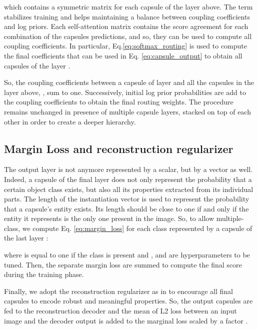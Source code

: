 \documentclass{article}
\begin{document}
\begin{ceqn}

\end{ceqn}
which contains a symmetric matrix  for each capsule  of the layer above. The term  stabilizes training and helps maintaining a balance between coupling coefficients and log priors. Each self-attention matrix contains the score agreement for each combination of the  capsules predictions, and so, they can be used to compute all coupling coefficients. In particular, Eq.\ref{eq:softmax_routing} is used to compute the final coefficients that can be used in Eq. \ref{eq:capsule_output} to obtain all capsules  of the layer .
\begin{ceqn}

\end{ceqn}
So, the coupling coefficients between a capsule of layer  and all the capsules in the layer above, , sum to one. Successively, initial log prior probabilities are add to the coupling coefficients to obtain the final routing weights. The procedure remains unchanged in presence of multiple capsule layers, stacked on top of each other in order to create a deeper hierarchy. 
\subsection{Margin Loss and reconstruction regularizer}
The output layer is not anymore represented by a scalar, but by a vector as well. Indeed, a capsule of the final layer does not only represent the probability that a certain object class exists, but also all its properties extracted from its individual parts. The length of the instantiation vector is used to represent the probability that a capsule's entity exists. Its length should be close to one if and only if the entity it represents is the only one present in the image. So, to allow multiple-class, we compute Eq. \ref{eq:margin_loss} for each class represented by a capsule  of the last layer :
\begin{ceqn}

\end{ceqn}
where  is equal to one if the class  is present and ,  and  are hyperparameters to be tuned. Then, the separate margin loss  are summed to compute the final score during the training phase.

Finally, we adopt the reconstruction regularizer as in \cite{sabour2017dynamic} to encourage all final capsules to encode robust and meaningful properties. So, the output capsules  are fed to the reconstruction decoder and the mean of L2 loss between an input image and the decoder output is added to the marginal loss scaled by a factor .  
\end{document}
